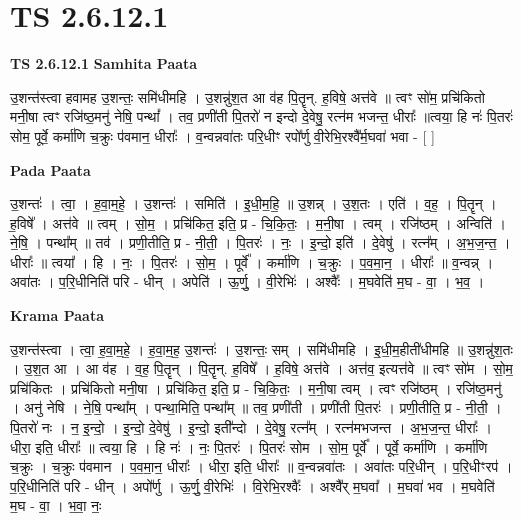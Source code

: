 \documentclass[17pt]{extarticle}
\begin{document}
\section*{ TS 2.6.12.1 }

\textbf{TS 2.6.12.1 } \newline
\textbf{Samhita Paata} \newline

उ॒शन्त॑स्त्वा हवामह उ॒शन्तः॒ समि॑धीमहि । उ॒शन्नु॑श॒त आ व॑ह पि॒तॄन्. ह॒विषे॒ अत्त॑वे ॥ त्वꣳ सो॑म॒ प्रचि॑कितो मनी॒षा त्वꣳ रजि॑ष्ठ॒मनु॑ नेषि॒ पन्थां᳚ । तव॒ प्रणी॑ती पि॒तरो॑ न इन्दो दे॒वेषु॒ रत्न॑म भजन्त॒ धीराः᳚ ॥त्वया॒ हि नः॑ पि॒तरः॑ सोम॒ पूर्वे॒ कर्मा॑णि च॒क्रुः प॑वमान॒ धीराः᳚ । व॒न्वन्नवा॑तः परि॒धीꣳ रपो᳚र्णु वी॒रेभि॒रश्वै᳚र्म॒घवा॑ भवा - [  ] \newline

\textbf{Pada Paata} \newline

उ॒शन्तः॑ । त्वा॒ । ह॒वा॒म॒हे॒ । उ॒शन्तः॑ । समिति॑ । इ॒धी॒म॒हि॒ ॥ उ॒शन्न् । उ॒श॒तः । एति॑ । व॒ह॒ । पि॒तॄन् । ह॒विषे᳚ । अत्त॑वे ॥ त्वम् । सो॒म॒ । प्रचि॑कित॒ इति॒ प्र - चि॒कि॒तः॒ । म॒नी॒षा । त्वम् । रजि॑ष्ठम् । अन्विति॑ । ने॒षि॒ । पन्था᳚म् ॥ तव॑ । प्रणी॒तीति॒ प्र - नी॒ती॒ । पि॒तरः॑ । नः॒ । इ॒न्दो॒ इति॑ । दे॒वेषु॑ । रत्न᳚म् । अ॒भ॒ज॒न्त॒ । धीराः᳚ ॥ त्वया᳚ । हि । नः॒ । पि॒तरः॑ । सो॒म॒ । पूर्वे᳚ । कर्मा॑णि । च॒क्रुः । प॒व॒मा॒न॒ । धीराः᳚ ॥ व॒न्वन्न् । अवा॑तः । प॒रि॒धीनिति॑ परि - धीन् । अपेति॑ । ऊ॒र्णु॒ । वी॒रेभिः॑ । अश्वैः᳚ । म॒घवेति॑ म॒घ - वा॒ । भ॒व॒ ।  \newline


\textbf{Krama Paata} \newline

उ॒शन्त॑स्त्वा । त्वा॒ ह॒वा॒म॒हे॒ । ह॒वा॒म॒ह॒ उ॒शन्तः॑ । उ॒शन्तः॒ सम् । समि॑धीमहि । इ॒धी॒म॒हीती॑धीमहि ॥ उ॒शन्नु॑श॒तः । उ॒श॒त आ । आ व॑ह । व॒ह॒ पि॒तॄन् । पि॒तॄन्. ह॒विषे᳚ । ह॒विषे॒ अत्त॑वे । अत्त॑व॒ इत्यत्त॑वे ॥ त्वꣳ सो॑म । सो॒म॒ प्रचि॑कितः । प्रचि॑कितो मनी॒षा । प्रचि॑कित॒ इति॒ प्र - चि॒कि॒तः॒ । म॒नी॒षा त्वम् । त्वꣳ रजि॑ष्ठम् । रजि॑ष्ठ॒मनु॑ । अनु॑ नेषि । ने॒षि॒ पन्था᳚म् । पन्था॒मिति॒ पन्था᳚म् ॥ तव॒ प्रणी॑ती । प्रणी॑ती पि॒तरः॑ । प्रणी॒तीति॒ प्र - नी॒ती॒ । पि॒तरो॑ नः । न॒ इ॒न्दो॒ । इ॒न्दो॒ दे॒वेषु॑ । इ॒न्दो॒ इती᳚न्दो । दे॒वेषु॒ रत्न᳚म् । रत्न॑मभजन्त । अ॒भ॒ज॒न्त॒ धीराः᳚ । धीरा॒ इति॒ धीराः᳚ ॥ त्वया॒ हि । हि नः॑ । नः॒ पि॒तरः॑ । पि॒तरः॑ सोम । सो॒म॒ पूर्वे᳚ । पूर्वे॒ कर्मा॑णि । कर्मा॑णि च॒क्रुः । च॒क्रुः प॑वमान । प॒व॒मा॒न॒ धीराः᳚ । धीरा॒ इति॒ धीराः᳚ ॥ व॒न्वन्नवा॑तः । अवा॑तः परि॒धीन् । प॒रि॒धीꣳरप॑ । प॒रि॒धीनिति॑ परि - धीन् । अपो᳚र्णु । ऊ॒र्णु॒ वी॒रेभिः॑ । वि॒रेभि॒रश्वैः᳚ । अश्वै᳚र् म॒घवा᳚ । म॒घवा॑ भव । म॒घवेति॑ म॒घ - वा॒ । भ॒वा॒ नः॒ \newline
\end{document}
